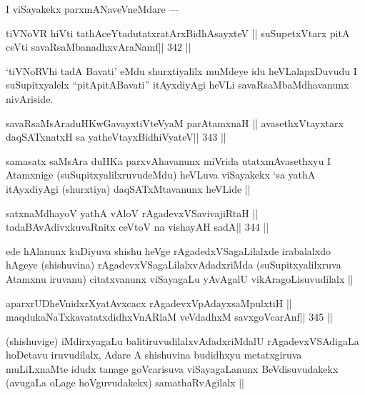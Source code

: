 \begin{artha}
I viSayakekx parxmANaveVneMdare ---
\end{artha}

\begin{shl}
tiVNoVR hiVti tathAceYtadutatxratArxBidhAsayxteV ||
suSupetxV\s tarx pitA ceVti savaRsaMbanadhxvAraNamf\hfill || 342 ||
\end{shl}

\begin{artha}
`tiVNoRVhi tadA Bavati' eMdu shurxtiyalilx muMdeye idu heVLalapxDuvudu I suSupitxyalelx ``pitA\s pitABavati'' itAyxdiyAgi heVLi savaRsaMbaMdhavanunx nivAriside.
\end{artha}

\begin{shl}
savaRsaMsAraduHKwGavayxtiVteVyaM parA\s\s tamxnaH ||
avasethxVtayxtarx daqSATxnatxH sa yatheVtayxBidhiVyateV\hfill || 343 ||
\end{shl}

\begin{artha}
samasatx saMsAra duHKa parxvAhavanunx miVrida utatxmAvasethxyu I Atamxnige (suSupitxyalilxruvudeMdu) heVLuva viSayakekx `sa yathA itAyxdiyAgi (shurxtiya) daqSATxMtavanunx heVLide ||
\end{artha}

\begin{shl}
satxnaMdhayoV yathA vAloV rAgadevxVSavivajiRtaH ||
tadaBAvAdivxkuvaRnitx ceVtoV na vishayAH sadA\hfill || 344 ||
\end{shl}

\begin{artha}
ede hAlanunx kuDiyuva shishu heVge rAgadedxVSagaLilalxde irabalalxdo hAgeye (shishuvina) rAgadevxVSagaLilalxvAdadxriMda (suSupitxyalilxruva Atamxnu iruvanu) citatxvanunx viSayagaLu yAvAgalU vikAragoLisuvudilalx ||
\end{artha}

\begin{shl}
aparxrUDheVnidxrXyatAvxcacx rAgadevxVpAdayxsaMpulxtiH ||
maqdukaNaTxkavatatxdidhxVnARlaM veVdadhxM savxgoVcarAnf\hfill || 345 ||
\end{shl}

\begin{artha}
(shishuvige) iMdirxyagaLu balitiruvudilalxvAdadxriMdalU rAgadevxVSAdigaLa hoDetavu iruvudilalx, Adare A shishuvina budidhxyu metatxgiruva muLiLxnaMte idudx tanage goVcarisuva viSayagaLanunx BeVdisuvudakekx (avugaLa oLage hoVguvudakekx) samathaRvAgilalx ||
\end{artha}

